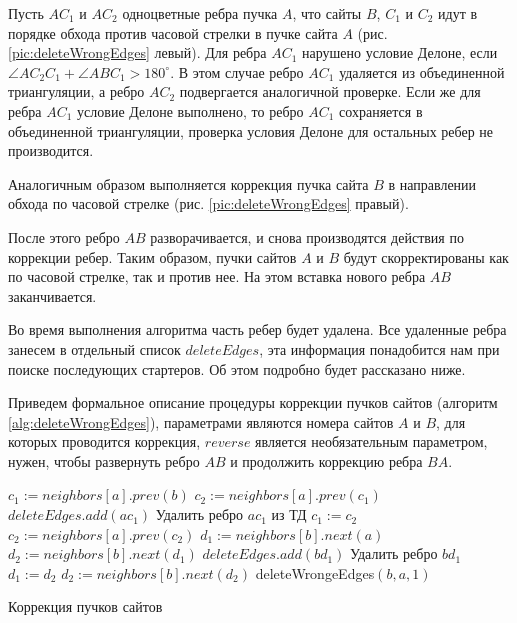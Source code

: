 \documentclass[12pt]{article}
\begin{document}
Пусть $AC_1$ и $AC_2$ одноцветные ребра пучка $A$,
что сайты $B$, $C_1$ и $C_2$ идут в порядке обхода против часовой стрелки в пучке сайта $A$ (рис. \ref{pic:deleteWrongEdges} левый).
Для ребра $AC_1$ нарушено условие Делоне, если $\angle AC_2C_1 + \angle ABC_1 > 180^\circ$.
В этом случае ребро $AC_1$ удаляется из объединенной триангуляции, а ребро $AC_2$ подвергается аналогичной проверке.
Если же для ребра $AC_1$ условие Делоне выполнено, то ребро $AC_1$ сохраняется в объединенной триангуляции,
проверка условия Делоне для остальных ребер не производится.

Аналогичным образом выполняется коррекция пучка сайта $B$ в направлении обхода по часовой стрелке (рис. \ref{pic:deleteWrongEdges} правый).

После этого ребро $AB$ разворачивается, и снова производятся действия по коррекции ребер.
Таким образом, пучки сайтов $A$ и $B$ будут скорректированы как по часовой стрелке, так и против нее.
На этом вставка нового ребра $AB$ заканчивается.

Во время выполнения алгоритма часть ребер будет удалена.
Все удаленные ребра занесем в отдельный список $deleteEdges$, эта информация понадобится нам при поиске последующих стартеров.
Об этом подробно будет рассказано ниже.

Приведем формальное описание процедуры коррекции пучков сайтов (алгоритм \ref{alg:deleteWrongEdges}),
параметрами являются номера сайтов $A$ и $B$, для которых проводится коррекция, $reverse$ является необязательным параметром, нужен, чтобы развернуть ребро $AB$ и продолжить коррекцию ребра $BA$.

\begin{algorithm}[htb!]
\begin{algorithmic}[1]
	\State $c_1 := neighbors[a].prev(b)$ 
	\State $c_2 := neighbors[a].prev(c_1)$
	    \State $deleteEdges.add(ac_1)$
		\State Удалить ребро $ac_1$ из ТД
		\State $c_1 := c_2$
		\State $c_2 := neighbors[a].prev(c_2)$
	\EndWhile
    	\State $d_1 := neighbors[b].next(a)$ 
	\State $d_2 := neighbors[b].next(d_1)$
		\State $deleteEdges.add(bd_1)$
		\State Удалить ребро $bd_1$
		\State $d_1 := d_2$
		\State $d_2 := neighbors[b].next(d_2)$
	\EndWhile
	 
		\State deleteWrongeEdges$(b, a, 1)$
	\EndIf
\EndProcedure
\end{algorithmic}
\caption{Коррекция пучков сайтов}
\label{alg:deleteWrongEdges}
\end{algorithm}
\end{document}
